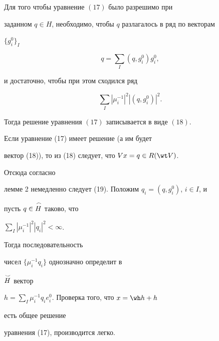 \begin{thm} 


Для того чтобы уравнение $(17)$ было разрешимо при 


заданном $q\in H$, необходимо, чтобы $q$ разлагалось в ряд по векторам 


$\{g^0_i\}_I$ 


\begin{equation} 


q=\sum_I(q,g^0_i)g^0_i, 


\end{equation} 


и достаточно, чтобы при этом сходился ряд 


\begin{equation} 


\sum_I|\mu^{-1}_i|^2|(q,g^0_i)|^2. 


\end{equation} 


Тогда решение уравнения $(17)$ записывается в виде $(18)$. 


\end{thm} 


 


\begin{pf} 


Если уравнение (17) имеет решение (а им будет 


вектор (18)), то из (18) следует, что $V x=q\in R(\wt V)$. 


Отсюда согласно 


лемме 2 немедленно следует (19). Положим $q_i=(q,g^0_i)$, $i\in I$, и 


пусть $q\in\overset{\,\frown}{H}{}$ таково, что 


$\sum\limits_I|\mu^{-1}_i|^2|q_i|^2<\infty$. 


Тогда последовательность 


чисел $\{\mu^{-1}_i q_i\}$ однозначно определит в 


$\overset{\,\smile}{H}{}$ вектор 


$h=\sum\limits_I \mu^{-1}_i q_i e^0_i$. Проверка того, что $x=\wh h+h$ 


есть общее решение 


уравнения (17), производится легко. 


\end{pf} 


 


